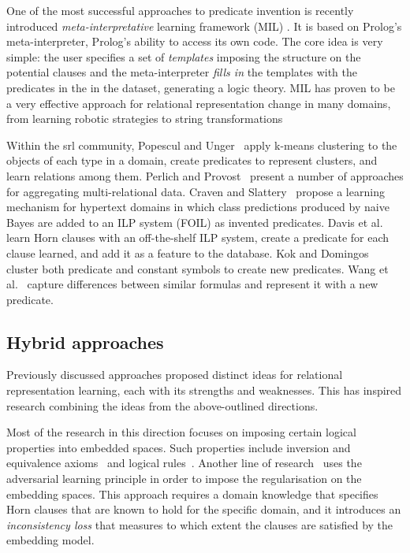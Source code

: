 One of the most successful approaches to predicate invention is recently introduced \textit{meta-interpretative} learning framework (MIL) \cite{MuggletonMIL,Cropper2018,Cropper:2015}.
It is based on Prolog's meta-interpreter, Prolog's ability to access its own code.
The core idea is very simple: the user specifies a set of \textit{templates} imposing the structure on the potential clauses and the meta-interpreter \textit{fills in} the templates with the predicates in the in the dataset, generating a logic theory.
MIL has proven to be a very effective approach for relational representation change in many domains, from learning robotic strategies to string transformations \cite{Cropper2015LearningEL,DBLP:journals/ml/MuggletonDSTWZ18,DBLP:conf/ilp/CropperTM15}



Within the \gls{srl} community,  Popescul and Unger~\cite{Popescul2004} apply k-means clustering to the objects of each type in a domain, create predicates to represent clusters, and learn relations among them.
Perlich and Provost~\cite{Perlich2003} present a number of approaches for aggregating multi-relational data.
Craven and Slattery~\cite{Craven2001} propose a learning mechanism for hypertext domains in which class predictions produced by naive Bayes are added to an ILP system (FOIL) as invented predicates.
Davis et al.~\cite{DavisOSBPC07} learn Horn clauses with an off-the-shelf ILP system, create a predicate for each clause learned, and add it as a feature to the database.
Kok and Domingos~\cite{Kok2007} cluster both predicate and constant symbols to create new predicates.
Wang et al.~\cite{WangMC15} capture differences between similar formulas and represent it with a new predicate.



\subsection{Hybrid approaches}


Previously discussed approaches proposed distinct ideas for relational representation learning, each with its strengths and weaknesses.
This has inspired research combining the ideas from the above-outlined directions.


Most of the research in this direction focuses on imposing certain logical properties into embedded spaces.
Such properties include inversion and equivalence axioms~\cite{DBLP:conf/pkdd/MinerviniCMNV17} and logical rules~\cite{demeester2016lifted,N15-1118,W14-2409}.
Another line of research~\cite{DBLP:conf/uai/MinerviniDRR17} uses the adversarial learning principle in order to impose the regularisation on the embedding spaces.
This approach requires a domain knowledge that specifies Horn clauses that are known to hold for the specific domain, and it introduces an \textit{inconsistency loss} that measures to which extent the clauses are satisfied by the embedding model.




